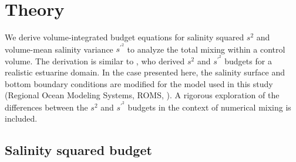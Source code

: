 \documentclass[draft]{agujournal2019}
\begin{document}
\section{Theory} \label{sec:theory}

We derive volume-integrated budget equations for salinity squared $s^2$ and volume-mean salinity variance $s^{\prime^2}$ to analyze the total mixing within a control volume. The derivation is similar to , who derived $s^2$ and $s^{\prime^2}$ budgets for a realistic estuarine domain. In the case presented here, the salinity surface and bottom boundary conditions are modified for the model used in this study (Regional Ocean Modeling Systems, ROMS, ). A rigorous exploration of the differences between the $s^2$ and $s^{\prime^2}$ budgets in the context of numerical mixing is included. 

\subsection{Salinity squared budget}
\end{document}
